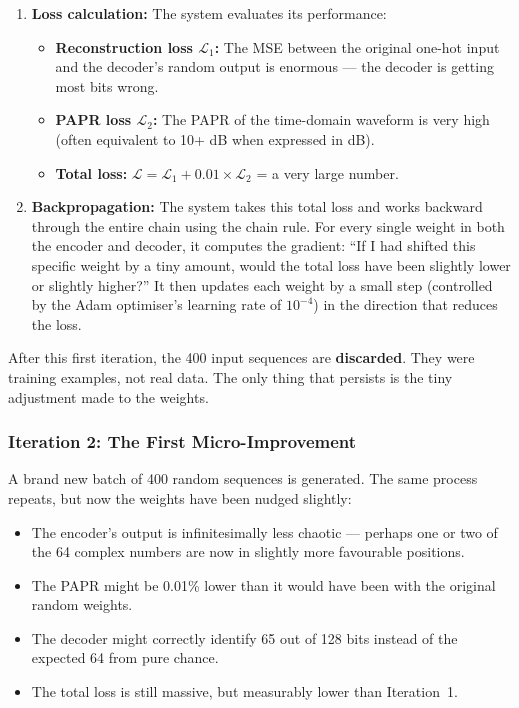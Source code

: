\begin{enumerate}
    \item \textbf{Loss calculation:}
          The system evaluates its performance:
          \begin{itemize}
              \item \textbf{Reconstruction loss $\mathcal{L}_1$:}
                    The MSE between the original one-hot input and the
                    decoder's random output is enormous --- the decoder
                    is getting most bits wrong.
              \item \textbf{PAPR loss $\mathcal{L}_2$:}
                    The PAPR of the time-domain waveform is very high
                    (often equivalent to 10+ dB when expressed in dB).
              \item \textbf{Total loss:}
                    $\mathcal{L} = \mathcal{L}_1 + 0.01 \times
                    \mathcal{L}_2$ = a very large number.
          \end{itemize}

    \item \textbf{Backpropagation:}
          The system takes this total loss and works backward through
          the entire chain using the chain rule.  For every single weight
          in both the encoder and decoder, it computes the gradient:
          ``If I had shifted this specific weight by a tiny amount,
          would the total loss have been slightly lower or slightly
          higher?''  It then updates each weight by a small step
          (controlled by the Adam optimiser's learning rate of
          $10^{-4}$) in the direction that reduces the loss.
\end{enumerate}

After this first iteration, the 400 input sequences are \textbf{discarded}.
They were training examples, not real data.  The only thing that persists
is the tiny adjustment made to the weights.

\subsubsection{Iteration 2: The First Micro-Improvement}

A brand new batch of 400 random sequences is generated.  The same process
repeats, but now the weights have been nudged slightly:

\begin{itemize}
    \item The encoder's output is infinitesimally less chaotic ---
          perhaps one or two of the 64 complex numbers are now in
          slightly more favourable positions.
    \item The PAPR might be 0.01\% lower than it would have been with
          the original random weights.
    \item The decoder might correctly identify 65 out of 128 bits
          instead of the expected 64 from pure chance.
    \item The total loss is still massive, but measurably lower than
          Iteration~1.
\end{itemize}


